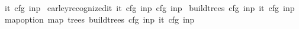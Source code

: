 \begin{isabellebody}
\isadelimproof
%
\endisadelimproof
%
\isatagproof
%
\endisatagproof
{\isafoldproof}%
%
\isadelimproof
\isanewline
%
\endisadelimproof
{}\isamarkupfalse%
\ {\isachardoublequoteopen}{\isasymII}{\isacharunderscore}{\kern0pt}it\ cfg{}\ inp{}{\isachardoublequoteclose}\isanewline
{}\isamarkupfalse%
\ {\isachardoublequoteopen}earley{\isacharunderscore}{\kern0pt}recognized{\isacharunderscore}{\kern0pt}it\ {\isacharparenleft}{\kern0pt}{\isasymII}{\isacharunderscore}{\kern0pt}it\ cfg{}\ inp{}{\isacharparenright}{\kern0pt}\ cfg{}\ inp{}{\isachardoublequoteclose}\isanewline
{}\isamarkupfalse%
\ {\isachardoublequoteopen}build{\isacharunderscore}{\kern0pt}trees\ cfg{}\ inp{}\ {\isacharparenleft}{\kern0pt}{\isasymII}{\isacharunderscore}{\kern0pt}it\ cfg{}\ inp{}{\isacharparenright}{\kern0pt}{\isachardoublequoteclose}\isanewline
{}\isamarkupfalse%
\ {\isachardoublequoteopen}map{\isacharunderscore}{\kern0pt}option\ {\isacharparenleft}{\kern0pt}map\ trees{\isacharparenright}{\kern0pt}\ {\isacharparenleft}{\kern0pt}build{\isacharunderscore}{\kern0pt}trees\ cfg{}\ inp{}\ {\isacharparenleft}{\kern0pt}{\isasymII}{\isacharunderscore}{\kern0pt}it\ cfg{}\ inp{}{\isacharparenright}{\kern0pt}{\isacharparenright}{\kern0pt}{\isachardoublequoteclose}\isanewline
%
\isadelimtheory
%
\endisadelimtheory
%
\isatagtheory
%
\endisatagtheory
{\isafoldtheory}%
%
\isadelimtheory
%
\endisadelimtheory
%
\end{isabellebody}%
\endinput
